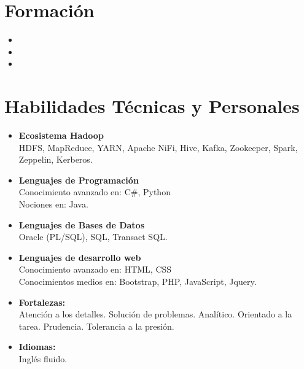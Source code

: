 \documentclass[11pt,a4paper,roman]{moderncv}        %
\begin{document}
\section{Formación}
\vspace{3pt}
\begin{itemize}
\item{}
\item{}
\item{}
\end{itemize}

\section{Habilidades Técnicas y Personales}
\vspace{3pt}
\begin{itemize}
\item \textbf{Ecosistema Hadoop}\\HDFS, MapReduce, YARN, Apache NiFi, Hive, Kafka, Zookeeper, Spark, Zeppelin, Kerberos.
\vspace{3pt}
\item \textbf{Lenguajes de Programación} \\Conocimiento avanzado en: C\#, Python \\Nociones en: Java.
\vspace{3pt}
\item \textbf{Lenguajes de Bases de Datos}\\ Oracle (PL/SQL), SQL, Transact SQL.
\vspace{3pt}
\item \textbf{Lenguajes de desarrollo web} \\Conocimiento avanzado en: HTML, CSS\\Conocimientos medios en: Bootstrap, PHP, JavaScript, Jquery.
\vspace{3pt}
\item \textbf{Fortalezas:} \\Atención a los detalles. Solución de problemas. Analítico. Orientado a la tarea. Prudencia. Tolerancia a la presión.
\vspace{3pt}
\item \textbf{Idiomas:} \\Inglés fluido.
\end{itemize}
\end{document}
